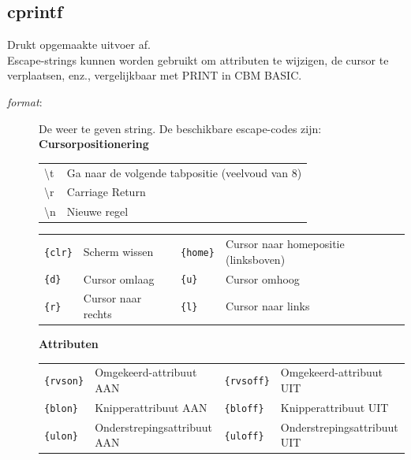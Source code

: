 \subsection{cprintf}
\begin{description}[leftmargin=2.4cm,style=nextline]
\item [Beschrijving:] {Drukt opgemaakte uitvoer af. \\    Escape-strings kunnen worden gebruikt om attributen te wijzigen, de cursor te verplaatsen, enz., vergelijkbaar met   PRINT in CBM BASIC.
    }
\item [Syntaxis:] \item [Parameters:]
\begin{description}
\item [{\em format}:] {De weer te geven string. De beschikbare escape-codes   zijn: \\
    \textbf{Cursorpositionering} \\
    \begin{tabular}{ll}
    \textbackslash t             & Ga naar de volgende tabpositie (veelvoud van 8) \\
    \textbackslash r             & Carriage Return            \\
    \textbackslash n             & Nieuwe regel          \\
    \end{tabular}

    \begin{tabular}{llll}
\texttt{\{clr\}}   &     Scherm wissen      &  \texttt{\{home\}}  & Cursor   naar homepositie (linksboven) \\    \texttt{\{d\}}     &    Cursor omlaag   & \texttt{\{u\}}      & Cursor   omhoog \\    \texttt{\{r\}}     &    Cursor naar rechts  & \texttt{\{l\}}     & Cursor   naar links \\

    \end{tabular}

\textbf{Attributen} \\
    \begin{tabular}{llll}
\texttt{\{rvson\}}  &  Omgekeerd-attribuut AAN   & \texttt{\{rvsoff\}} &   Omgekeerd-attribuut UIT \\    \texttt{\{blon\}}   &  Knipperattribuut AAN     & \texttt{\{bloff\}}  &  Knipperattribuut UIT    \\    \texttt{\{ulon\}}   &  Onderstrepingsattribuut AAN & \texttt{\{uloff\}}  &   Onderstrepingsattribuut UIT \\ \end{tabular}

}
\end{description}
\end{description}

